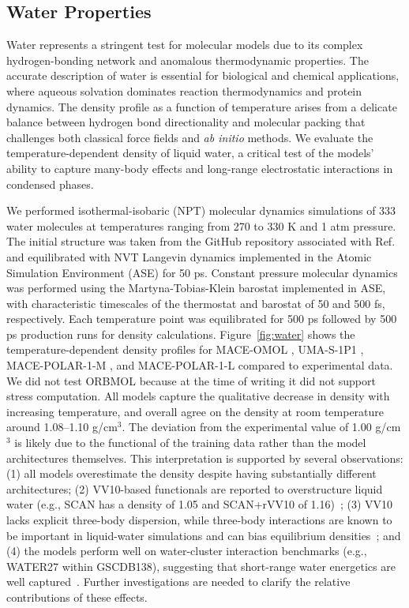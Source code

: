 \documentclass[aps,%
superscriptaddress,
 amsmath,amssymb,
floatfix,
twocolumn
]{revtex4-2}
\newcommand{\MOMOL}{MACE-OMOL }
\newcommand{\MFPM}{MACE-POLAR-1-M }
\newcommand{\MFPL}{MACE-POLAR-1-L }
\newcommand{\UMAS}{UMA-S-1P1 }
\newcommand{\ORBMOL}{ORBMOL }
\begin{document}
\subsection{Water Properties}

Water represents a stringent test for molecular models due to its complex hydrogen-bonding network and anomalous thermodynamic properties.
The accurate description of water is essential for biological and chemical applications, where aqueous solvation dominates reaction thermodynamics and protein dynamics.
The density profile as a function of temperature arises from a delicate balance between hydrogen bond directionality and molecular packing that challenges both classical force fields and \textit{ab initio} methods. We evaluate the temperature-dependent density of liquid water, a critical test of the models' ability to capture many-body effects and long-range electrostatic interactions in condensed phases.

We performed isothermal-isobaric (NPT) molecular dynamics simulations of 333 water molecules at temperatures ranging from 270 to 330 K and 1 atm pressure. The initial structure was taken from the GitHub repository associated with Ref.~\cite{Weber2025MPNICE} and equilibrated with NVT Langevin dynamics implemented in the Atomic Simulation Environment (ASE) \cite{ASE} for 50 ps. Constant pressure molecular dynamics was performed using the
Martyna-Tobias-Klein barostat implemented in ASE, with characteristic timescales of the thermostat and barostat of 50 and 500 fs, respectively. Each temperature point was equilibrated for 500 ps followed by 500 ps production runs for density calculations.
%
Figure~\ref{fig:water} shows the temperature-dependent density profiles for \MOMOL, \UMAS, \MFPM, and \MFPL compared to experimental data. We did not test \ORBMOL because at the time of writing it did not support stress computation. All models capture the qualitative decrease in density with increasing temperature, and overall agree on the density at room temperature around 1.08--1.10 g/cm$^3$.
%
The deviation from the experimental value of 1.00 g/cm$^3$ is likely due to the functional of the training data rather than the model architectures themselves. This interpretation is supported by several observations: (1) all models overestimate the density despite having substantially different architectures; (2) VV10-based functionals are reported to overstructure liquid water (e.g., SCAN has a density of 1.05 and SCAN+rVV10 of 1.16)~\cite{wiktor2017scanrvv10}; (3) VV10 lacks explicit three-body dispersion, while three-body interactions are known to be important in liquid-water simulations and can bias equilibrium densities~\cite{pruitt2016threebodywater}; and (4) the models perform well on water-cluster interaction benchmarks (e.g., WATER27 within GSCDB138), suggesting that short-range water energetics are well captured~\cite{manna2017water27,Liang2025}. Further investigations are needed to clarify the relative contributions of these effects.
%
\end{document}

